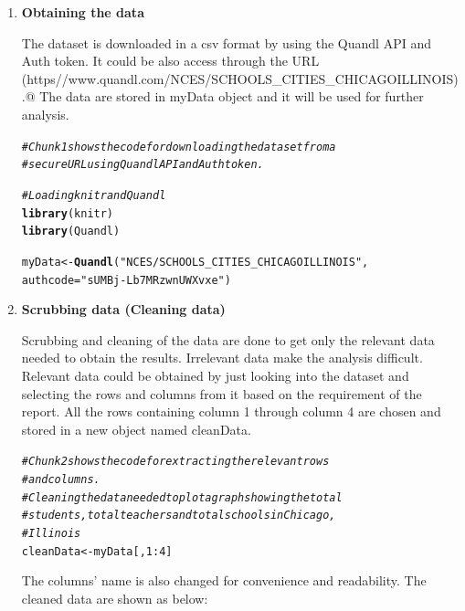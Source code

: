 \documentclass{article}\usepackage[]{graphicx}\usepackage[]{color}
\makeatletter
\newcommand{\hlnum}[1]{\textcolor[rgb]{0.686,0.059,0.569}{#1}}%
\newcommand{\hlstr}[1]{\textcolor[rgb]{0.192,0.494,0.8}{#1}}%
\newcommand{\hlcom}[1]{\textcolor[rgb]{0.678,0.584,0.686}{\textit{#1}}}%
\newcommand{\hlopt}[1]{\textcolor[rgb]{0,0,0}{#1}}%
\newcommand{\hlstd}[1]{\textcolor[rgb]{0.345,0.345,0.345}{#1}}%
\newcommand{\hlkwb}[1]{\textcolor[rgb]{0.69,0.353,0.396}{#1}}%
\newcommand{\hlkwc}[1]{\textcolor[rgb]{0.333,0.667,0.333}{#1}}%
\newcommand{\hlkwd}[1]{\textcolor[rgb]{0.737,0.353,0.396}{\textbf{#1}}}%
\newenvironment{kframe}{%
 \def\at@end@of@kframe{}%
 \ifinner\ifhmode%
  \def\at@end@of@kframe{\end{minipage}}%
  \begin{minipage}{\columnwidth}%
 \fi\fi%
 \def\FrameCommand##1{\hskip\@totalleftmargin \hskip-\fboxsep
 \colorbox{shadecolor}{##1}\hskip-\fboxsep
     \hskip-\linewidth \hskip-\@totalleftmargin \hskip\columnwidth}%
 \MakeFramed {\advance\hsize-\width
   \@totalleftmargin\z@ \linewidth\hsize
   \@setminipage}}%
 {\par\unskip\endMakeFramed%
 \at@end@of@kframe}
\newenvironment{knitrout}{}{} %
\makeatother
\begin{document}
\begin{enumerate}
    \item \textbf{Obtaining the data}

The dataset is downloaded in a csv format by using the Quandl API and Auth token.
It could be also access through the URL 
\\\verb@(https//www.quandl.com/NCES/SCHOOLS_CITIES_CHICAGOILLINOIS).@
The data are stored in myData object and it will be used for further analysis.

\begin{knitrout}
\color{fgcolor}\begin{kframe}
\begin{alltt}
\hlcom{# Chunk1 shows the code for downloading the dataset from a }
\hlcom{# secure URL using Quandl API and Auth token.}

\hlcom{# Loading knitr and Quandl}
\hlkwd{library}\hlstd{(knitr)}
\hlkwd{library}\hlstd{(Quandl)}

\hlstd{myData} \hlkwb{<-} \hlkwd{Quandl}\hlstd{(}\hlstr{"NCES/SCHOOLS_CITIES_CHICAGOILLINOIS"}\hlstd{,}
                 \hlkwc{authcode}\hlstd{=}\hlstr{"sUMBj-Lb7MRzwnUWXvxe"}\hlstd{)}
\end{alltt}
\end{kframe}
\end{knitrout}
\item \textbf{Scrubbing data (Cleaning data)}
 
Scrubbing and cleaning of the data are done to get only the relevant data needed to obtain the results. Irrelevant data make the analysis difficult. Relevant data could be obtained by just looking into the dataset and selecting the rows and columns from it based on the requirement of the report. All the rows containing column 1 through column 4 are chosen and stored in a new object named cleanData.


\begin{knitrout}
\color{fgcolor}\begin{kframe}
\begin{alltt}
\hlcom{# Chunk2 shows the code for extracting the relevant rows }
\hlcom{# and columns.}
\hlcom{# Cleaning the data needed to plot a graph showing the total }
\hlcom{# students, total teachers and total schools in Chicago, }
\hlcom{# Illinois}
\hlstd{cleanData}\hlkwb{<-}\hlstd{myData[,}\hlnum{1}\hlopt{:}\hlnum{4}\hlstd{]}
\end{alltt}
\end{kframe}
\end{knitrout}
The columns' name is also changed for convenience and readability. The cleaned data are shown as below:



\end{enumerate}
\end{document}
